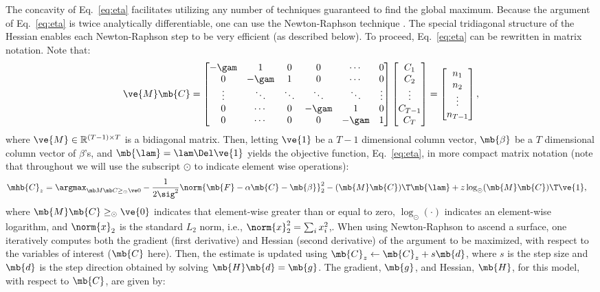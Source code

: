 The concavity of Eq.~\eqref{eq:eta} facilitates utilizing any number of techniques guaranteed to find the global maximum.  Because the argument of Eq.~\eqref{eq:eta} is twice analytically differentiable, one can use the Newton-Raphson technique \cite{Press92}. The special tridiagonal structure of the Hessian enables each Newton-Raphson step to be very efficient (as described below).  To proceed, Eq.~\eqref{eq:eta} can be rewritten in matrix notation.  Note that:
\begin{align} \label{eq:M}
\ve{M} \mb{C} = %
\begin{bmatrix}
-\gam & 1 & 0 & 0 & \cdots & 0 \\
0 & -\gam & 1 & 0 & \cdots  & 0 \\
\vdots & \ddots & \ddots & \ddots & \ddots & \vdots  \\
0 & \cdots & 0  & -\gam & 1 & 0 \\
0 & \cdots & 0 & 0 & -\gam & 1
\end{bmatrix}
\begin{bmatrix}
C_1 \\ C_2 \\  \vdots \\ C_{T-1} \\ C_T
\end{bmatrix}
= 
\begin{bmatrix}
n_1 \\ n_2 \\ \vdots  \\ n_{T-1}
\end{bmatrix}
, %
\end{align}
\noindent where $\ve{M} \in \mathbb{R}^{(T-1) \times T}$ is a bidiagonal matrix.  Then, letting $\ve{1}$ be a $T-1$ dimensional column vector, $\mb{\beta}$ be a $T$ dimensional column vector of $\beta$'s, and $\mb{\lam}=\lam \Del \ve{1}$ yields the objective function, Eq.~\eqref{eq:eta}, in more compact matrix notation (note that throughout we will use the subscript $\odot$ to indicate element wise operations):
\begin{align} 
\mhb{C}_{\zzz} 
&= \az  -\frac{1}{2 \sig^2} \norm{\mb{F} - \alpha \mb{C} -\mb{\beta}}_2^2 - (\mb{M} \mb{C} )\T \mb{\lam}  + \zzz \log_\odot(\mb{M} \mb{C})\T\ve{1},  \label{eq:eta3}
\end{align}
\noindent where  $\mb{M} \mb{C} \geq_\odot \ve{0}$ indicates that element-wise greater than or equal to zero, $\log_\odot(\cdot)$ indicates an element-wise logarithm, and $\norm{x}_2$ is the standard $L_2$ norm, i.e., $\norm{x}_2^2=\sum_i x_i^2$,. When using Newton-Raphson to ascend a surface, one iteratively computes both the gradient (first derivative) and Hessian (second derivative) of the argument to be maximized, with respect to the variables of interest ($\mb{C}$ here).  Then, the estimate is updated using $\mb{C}_z \leftarrow \mb{C}_z + s \mb{d}$, where $s$ is the step size and $\mb{d}$ is the step direction obtained by solving $\mb{H} \mb{d} = \mb{g}$.  The gradient, $\mb{g}$, and Hessian, $\mb{H}$, for this model, with respect to $\mb{C}$, are given by:
